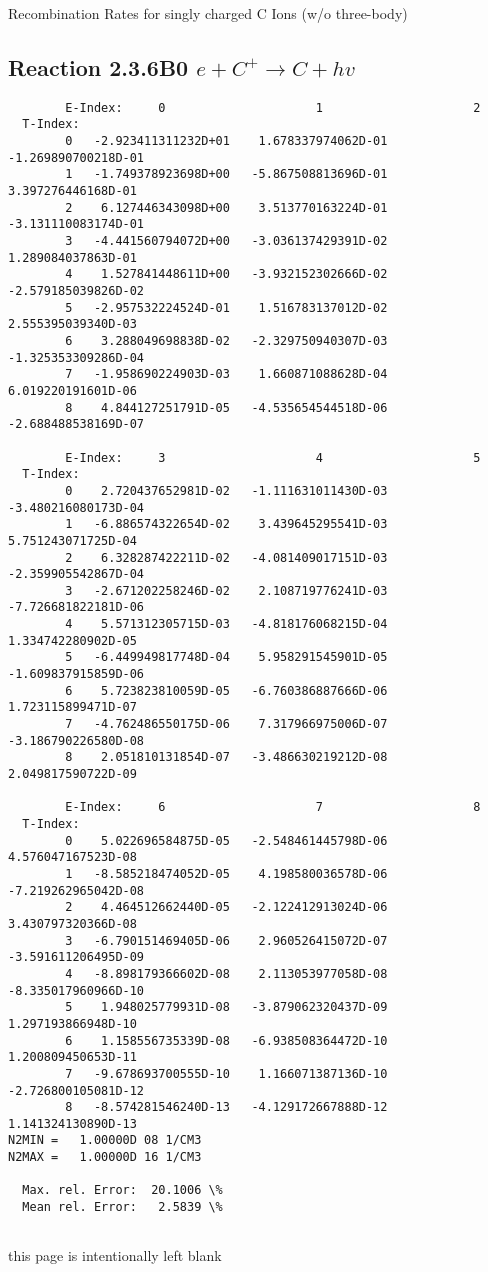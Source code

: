 \documentclass[12pt,dvipdfmx]{article}
\begin{document}
  Recombination Rates for singly charged C Ions (w/o three-body)
\subsection{
Reaction 2.3.6B0  $e + C^{+} \rightarrow C + hv$
}

\begin{small}\begin{verbatim}
        E-Index:     0                     1                     2
  T-Index:
        0   -2.923411311232D+01    1.678337974062D-01   -1.269890700218D-01
        1   -1.749378923698D+00   -5.867508813696D-01    3.397276446168D-01
        2    6.127446343098D+00    3.513770163224D-01   -3.131110083174D-01
        3   -4.441560794072D+00   -3.036137429391D-02    1.289084037863D-01
        4    1.527841448611D+00   -3.932152302666D-02   -2.579185039826D-02
        5   -2.957532224524D-01    1.516783137012D-02    2.555395039340D-03
        6    3.288049698838D-02   -2.329750940307D-03   -1.325353309286D-04
        7   -1.958690224903D-03    1.660871088628D-04    6.019220191601D-06
        8    4.844127251791D-05   -4.535654544518D-06   -2.688488538169D-07

        E-Index:     3                     4                     5
  T-Index:
        0    2.720437652981D-02   -1.111631011430D-03   -3.480216080173D-04
        1   -6.886574322654D-02    3.439645295541D-03    5.751243071725D-04
        2    6.328287422211D-02   -4.081409017151D-03   -2.359905542867D-04
        3   -2.671202258246D-02    2.108719776241D-03   -7.726681822181D-06
        4    5.571312305715D-03   -4.818176068215D-04    1.334742280902D-05
        5   -6.449949817748D-04    5.958291545901D-05   -1.609837915859D-06
        6    5.723823810059D-05   -6.760386887666D-06    1.723115899471D-07
        7   -4.762486550175D-06    7.317966975006D-07   -3.186790226580D-08
        8    2.051810131854D-07   -3.486630219212D-08    2.049817590722D-09

        E-Index:     6                     7                     8
  T-Index:
        0    5.022696584875D-05   -2.548461445798D-06    4.576047167523D-08
        1   -8.585218474052D-05    4.198580036578D-06   -7.219262965042D-08
        2    4.464512662440D-05   -2.122412913024D-06    3.430797320366D-08
        3   -6.790151469405D-06    2.960526415072D-07   -3.591611206495D-09
        4   -8.898179366602D-08    2.113053977058D-08   -8.335017960966D-10
        5    1.948025779931D-08   -3.879062320437D-09    1.297193866948D-10
        6    1.158556735339D-08   -6.938508364472D-10    1.200809450653D-11
        7   -9.678693700555D-10    1.166071387136D-10   -2.726800105081D-12
        8   -8.574281546240D-13   -4.129172667888D-12    1.141324130890D-13
N2MIN =   1.00000D 08 1/CM3
N2MAX =   1.00000D 16 1/CM3

  Max. rel. Error:  20.1006 \%
  Mean rel. Error:   2.5839 \%


\end{verbatim}\end{small}
\newpage
this page is intentionally left blank
\newpage
\end{document}
